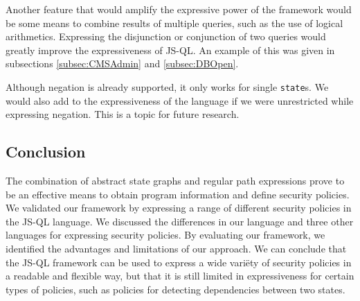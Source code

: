 Another feature that would amplify the expressive power of the framework would be some means to combine results of multiple queries, such as the use of logical arithmetics. Expressing the disjunction or conjunction of two queries would greatly improve the expressiveness of JS-QL. An example of this was given in subsections \ref{subsec:CMSAdmin} and \ref{subsec:DBOpen}. 


Although negation is already supported, it only works for single \texttt{state}s. We would also add to the expressiveness of the language if we were unrestricted while expressing negation. This is a topic for future research.


\subsection{Conclusion}

The combination of abstract state graphs and regular path expressions prove to be an effective means to obtain program information and define security policies. We validated our framework by expressing a range of different security policies in the JS-QL language. We discussed the differences in our language and three other languages for expressing security policies. By evaluating our framework, we identified the advantages and limitations of our approach. We can conclude that the JS-QL framework can be used to express a wide variëty of security policies in a readable and flexible way, but that it is still limited in expressiveness for certain types of policies, such as policies for detecting dependencies between two states.
  


